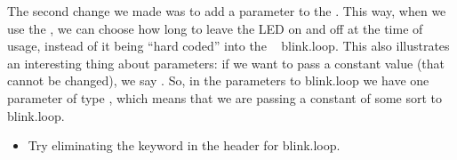 The second change we made was to add a parameter to the \PROC. This way, when we use the \PROC, we can choose how long to leave the LED on and off at the time of usage, instead of it being ``hard coded'' into the \PROC ~ {\code blink.loop}. This also illustrates an interesting thing about \occam parameters: if we want to pass a constant value (that cannot be changed), we say \VAL. So, in the parameters to {\code blink.loop} we have one parameter of type \VALINT, which means that we are passing a constant of some sort to {\code blink.loop}.

\makingthingsbreak
\begin{itemize}
	\item Try eliminating the keyword \VAL in the \PROC header for {\code blink.loop}.
\end{itemize}

\seealso

\XXX